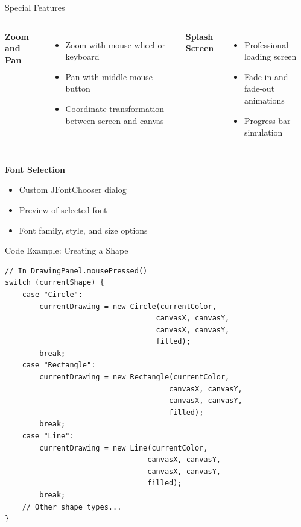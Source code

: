 \documentclass{beamer}
\begin{document}
\begin{frame}{Special Features}
\begin{columns}
\textbf{Zoom and Pan}
\begin{itemize}
\item Zoom with mouse wheel or keyboard
\item Pan with middle mouse button
\item Coordinate transformation between screen and canvas
\end{itemize}

\textbf{Splash Screen}
\begin{itemize}
\item Professional loading screen
\item Fade-in and fade-out animations
\item Progress bar simulation
\end{itemize}
\end{columns}

\vspace{0.5cm}
\textbf{Font Selection}
\begin{itemize}
\item Custom JFontChooser dialog
\item Preview of selected font
\item Font family, style, and size options
\end{itemize}
\end{frame}

\begin{frame}[fragile]{Code Example: Creating a Shape}
\begin{verbatim}
// In DrawingPanel.mousePressed()
switch (currentShape) {
    case "Circle":
        currentDrawing = new Circle(currentColor, 
                                   canvasX, canvasY, 
                                   canvasX, canvasY, 
                                   filled);
        break;
    case "Rectangle":
        currentDrawing = new Rectangle(currentColor, 
                                      canvasX, canvasY, 
                                      canvasX, canvasY, 
                                      filled);
        break;
    case "Line":
        currentDrawing = new Line(currentColor, 
                                 canvasX, canvasY, 
                                 canvasX, canvasY, 
                                 filled);
        break;
    // Other shape types...
}
\end{verbatim}
\end{frame}
\end{document}
